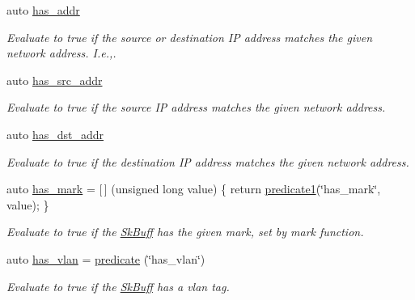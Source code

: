 \begin{DoxyCompactItemize}
auto \hyperlink{namespacepfq_1_1lang_1_1anonymous__namespace_02default_8hpp_03_a74c6b7e812fb3d312ebf534960a6a91d}{has\+\_\+addr}
\begin{DoxyCompactList}\small\item\em Evaluate to {\ttfamily true} if the source or destination I\+P address matches the given network address. I.\+e.,. \end{DoxyCompactList}\item 
auto \hyperlink{namespacepfq_1_1lang_1_1anonymous__namespace_02default_8hpp_03_acb03dd3e34d6dd7e83d621fa9077194c}{has\+\_\+src\+\_\+addr}
\begin{DoxyCompactList}\small\item\em Evaluate to {\ttfamily true} if the source I\+P address matches the given network address. \end{DoxyCompactList}\item 
auto \hyperlink{namespacepfq_1_1lang_1_1anonymous__namespace_02default_8hpp_03_a0a53822af0ed8ea341f16a1da5ea83e3}{has\+\_\+dst\+\_\+addr}
\begin{DoxyCompactList}\small\item\em Evaluate to {\ttfamily true} if the destination I\+P address matches the given network address. \end{DoxyCompactList}\item 
auto \hyperlink{namespacepfq_1_1lang_1_1anonymous__namespace_02default_8hpp_03_aa4ce1fdb0d99e1ca0afdf76619c58d12}{has\+\_\+mark} = \mbox{[}$\,$\mbox{]} (unsigned long value) \{ return \hyperlink{namespacepfq_1_1lang_a3e018f096545ca95a68e67027c8e3144}{predicate1}(\char`\"{}has\+\_\+mark\char`\"{}, value); \}
\begin{DoxyCompactList}\small\item\em Evaluate to {\ttfamily true} if the \hyperlink{structpfq_1_1lang_1_1SkBuff}{Sk\+Buff} has the given {\ttfamily mark}, set by mark function. \end{DoxyCompactList}\item 
auto \hyperlink{namespacepfq_1_1lang_1_1anonymous__namespace_02default_8hpp_03_a1f0378ddfa90777d11ffae5fbb57b4e0}{has\+\_\+vlan} = \hyperlink{namespacepfq_1_1lang_a6c156f209614d0291b280153416dba97}{predicate} (\char`\"{}has\+\_\+vlan\char`\"{})
\begin{DoxyCompactList}\small\item\em Evaluate to {\ttfamily true} if the \hyperlink{structpfq_1_1lang_1_1SkBuff}{Sk\+Buff} has a vlan tag. \end{DoxyCompactList}\item 

\end{DoxyCompactItemize}
